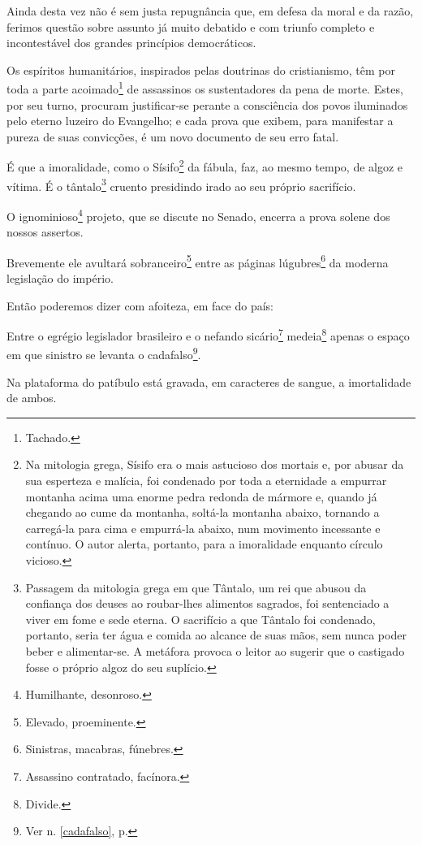 Ainda desta vez não é sem justa repugnância que, em defesa da moral e da
razão, ferimos questão sobre assunto já muito debatido e com triunfo
completo e incontestável dos grandes princípios democráticos.

Os espíritos humanitários, inspirados pelas doutrinas do cristianismo,
têm por toda a parte acoimado\footnote{Tachado.} de assassinos os
sustentadores da pena de morte. Estes, por seu turno, procuram
justificar-se perante a consciência dos povos iluminados pelo eterno
luzeiro do Evangelho; e cada prova que exibem, para manifestar a pureza
de suas convicções, é um novo documento de seu erro fatal.

É que a imoralidade, como o Sísifo\footnote{Na mitologia grega, Sísifo
  era o mais astucioso dos mortais e, por abusar da sua esperteza e
  malícia, foi condenado por toda a eternidade a empurrar montanha acima
  uma enorme pedra redonda de mármore e, quando já chegando ao cume da
  montanha, soltá-la montanha abaixo, tornando a carregá-la para cima e
  empurrá-la abaixo, num movimento incessante e contínuo. O autor
  alerta, portanto, para a imoralidade enquanto círculo vicioso.} da
fábula, faz, ao mesmo tempo, de algoz e vítima. É o tântalo\footnote{
  Passagem da mitologia grega em que Tântalo, um rei que abusou da
  confiança dos deuses ao roubar-lhes alimentos sagrados, foi
  sentenciado a viver em fome e sede eterna. O sacrifício a que Tântalo
  foi condenado, portanto, seria ter água e comida ao alcance de suas
  mãos, sem nunca poder beber e alimentar-se. A metáfora provoca o
  leitor ao sugerir que o castigado fosse o próprio algoz do seu
  suplício.} cruento presidindo irado ao seu próprio sacrifício.

O ignominioso\footnote{Humilhante, desonroso.} projeto, que se discute
no Senado, encerra a prova solene dos nossos assertos.

Brevemente ele avultará sobranceiro\footnote{Elevado, proeminente.}
entre as páginas lúgubres\footnote{Sinistras, macabras, fúnebres.} da
moderna legislação do império.

Então poderemos dizer com afoiteza, em face do país:

Entre o egrégio legislador brasileiro e o nefando sicário\footnote{Assassino contratado, 
facínora.} medeia\footnote{Divide.} apenas o
espaço em que sinistro se levanta o cadafalso\footnote{Ver n. \ref{cadafalso}, 
p. \pageref{cadafalso}}.

Na plataforma do patíbulo está gravada, em caracteres de sangue, a
imortalidade de ambos.

